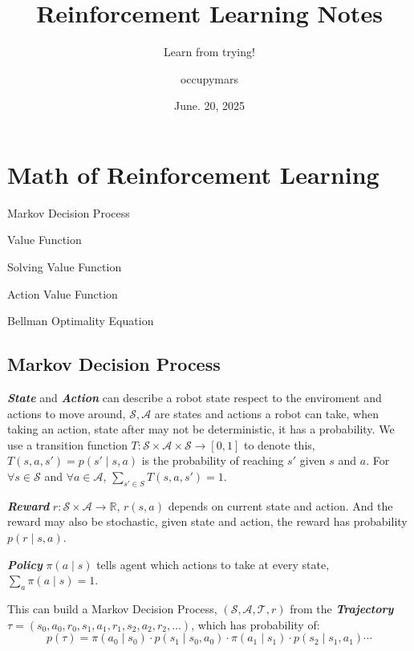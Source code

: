 \documentclass[10pt]{elegantbook}
\title{Reinforcement Learning Notes}
\subtitle{Learn from trying!}
\author{occupymars}
\date{June. 20, 2025}
\newcommand{\mydefination}[1]{\textbf{\textit{\textcolor{structurecolor}{#1}}}}
\begin{document}
\maketitle

\frontmatter
\tableofcontents

\mainmatter

\chapter{Math of Reinforcement Learning}

\begin{introduction}
    \item Markov Decision Process
    \item Value Function
    \item Solving Value Function
    \item Action Value Function
    \item Bellman Optimality Equation
\end{introduction}
    
\section{Markov Decision Process}
\mydefination{State} and \mydefination{Action} can describe a robot state respect to the enviroment and actions to move around, 
$\mathcal S, \mathcal A$ are states and actions a robot can take, when taking an action, state after may not
be deterministic, it has a probability. We use a transition function $T: \mathcal S \times \mathcal A \times 
\mathcal S \rightarrow [0, 1]$ to denote this, $T(s, a, s') = p(s' \mid s,a)$ is the probability of reaching $s'$
given $s$ and $a$. For $\forall s \in \mathcal S$ and $\forall a \in \mathcal A$, $\sum_{s'\in S}T(s, a, s') = 1$. 

\mydefination{Reward} $r:\mathcal S \times \mathcal A \rightarrow \mathbb R$, $r(s,a)$ depends on current state and action. And the reward
may also be stochastic, given state and action, the reward has probability $p(r \mid s, a)$.

\mydefination{Policy} $\pi(a \mid s)$ tells agent which actions to take at every state, $\sum_a \pi(a \mid s) = 1$.

This can build a Markov Decision Process, $(\mathcal S, \mathcal A, \mathcal T, r)$ from the \mydefination{Trajectory} 
$\tau = (s_0, a_0, r_0, s_1, a_1, r_1, s_2, a_2, r_2, \ldots)$, which has probability of:
\[ p(\tau) = \pi(a_0\mid s_0) \cdot p(s_1 \mid s_0, a_0) \cdot \pi(a_1\mid s_1) \cdot p(s_2 \mid s_1, a_1) \cdots \] 
\end{document}
